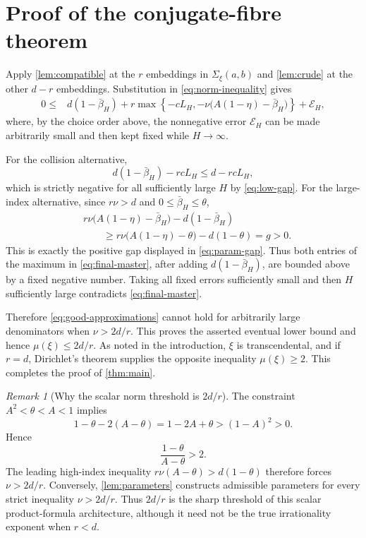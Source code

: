 \documentclass[11pt]{article}
\newcommand{\Comp}{\Sigma_{\xi}(a,b)}
\theoremstyle{definition}
\theoremstyle{remark}
\newtheorem{remark}[theorem]{Remark}
\numberwithin{equation}{section}
\begin{document}
\section{Proof of the conjugate-fibre theorem}\label{sec:proof}

Apply \cref{lem:compatible} at the $r$ embeddings in $\Comp$ and
\cref{lem:crude} at the other $d-r$ embeddings.  Substitution in
\eqref{eq:norm-inequality} gives
\begin{align}\label{eq:final-master}
 0\le{}&d(1-\bar\beta_H)
 +r\max\left\{-cL_H,
 -\nu\bigl(A(1-\eta)-\bar\beta_H\bigr)\right\}
 +\mathcal E_H,
\end{align}
where, by the choice order above, the nonnegative error
$\mathcal E_H$ can be made arbitrarily small and then kept fixed while
$H\to\infty$.

For the collision alternative,
\[
 d(1-\bar\beta_H)-rcL_H\le d-rcL_H,
\]
which is strictly negative for all sufficiently large $H$ by
\eqref{eq:low-gap}.  For the large-index alternative, since
$r\nu>d$ and $0\le\bar\beta_H\le\theta$,
\begin{align*}
 &r\nu\bigl(A(1-\eta)-\bar\beta_H\bigr)
   -d(1-\bar\beta_H)\\
 &\qquad\ge
 r\nu\bigl(A(1-\eta)-\theta\bigr)-d(1-\theta)
 =g>0.
\end{align*}
This is exactly the positive gap displayed in \eqref{eq:param-gap}.  Thus both entries of the maximum in
\eqref{eq:final-master}, after adding $d(1-\bar\beta_H)$, are bounded
above by a fixed negative number.  Taking all fixed errors sufficiently
small and then $H$ sufficiently large contradicts
\eqref{eq:final-master}.

Therefore \eqref{eq:good-approximations} cannot hold for arbitrarily
large denominators when $\nu>2d/r$.  This proves the asserted eventual
lower bound and hence $\mu(\xi)\le2d/r$.  As noted in the introduction,
$\xi$ is transcendental, and if $r=d$, Dirichlet's theorem supplies the
opposite inequality $\mu(\xi)\ge2$.  This completes the proof of
\cref{thm:main}.

\begin{remark}[Why the scalar norm threshold is $2d/r$]
The constraint $A^2<\theta<A<1$ implies
\[
 1-\theta-2(A-\theta)=1-2A+\theta>(1-A)^2>0.
\]
Hence
\[
 \frac{1-\theta}{A-\theta}>2.
\]
The leading high-index inequality
$r\nu(A-\theta)>d(1-\theta)$ therefore forces
$\nu>2d/r$.  Conversely, \cref{lem:parameters} constructs admissible
parameters for every strict inequality $\nu>2d/r$.  Thus $2d/r$ is the
sharp threshold of this scalar product-formula architecture, although
it need not be the true irrationality exponent when $r<d$.
\end{remark}
\end{document}
